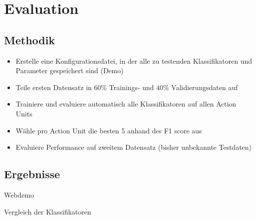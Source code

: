 \documentclass{beamer}
\begin{document}
\section{Evaluation}
\subsection{Methodik}
\begin{frame}
  \begin{itemize}
  \item Erstelle eine Konfigurationsdatei, in der alle zu testenden
    Klassifikatoren und Parameter gespeichert sind (Demo)
  \item Teile ersten Datensatz in $60\%$ Trainings- und $40\%$ Validierungsdaten auf
    \item Trainiere und evaluiere automatisch alle Klassifikatoren auf allen
      Action Units
    \item Wähle pro Action Unit die besten 5 anhand des F1 score aus
    \item Evaluiere Performance auf zweitem Datensatz (bisher unbekannte Testdaten)
  \end{itemize}
\end{frame}

\subsection{Ergebnisse}
\begin{frame}[c]
  \begin{center}
    \Huge Webdemo
  \end{center}
\end{frame}
\begin{frame}
  \begin{table}
  \centering
  \caption{Vergleich der Klassifikatoren}
  \label{tab:prec-recall}
  \end{table}
\end{frame}
\end{document}

